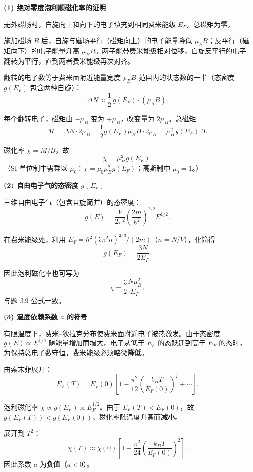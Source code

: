 \begin{derivationbox}[标准解题过程]
\textbf{(1) 绝对零度泡利顺磁化率的证明}

无外磁场时，自旋向上和向下的电子填充到相同费米能级 $E_F$，总磁矩为零。

施加磁场 $B$ 后，自旋与磁场平行（磁矩向上）的电子能量降低 $\mu_BB$；反平行（磁矩向下）的电子能量升高 $\mu_BB$。两子能带费米能级相对位移，自旋反平行的电子翻转为平行，直到两者费米能级再次对齐。

翻转的电子数等于费米面附近能量宽度 $\mu_BB$ 范围内的状态数的一半（态密度 $g(E_F)$ 包含两种自旋）：
\begin{equation}
\Delta N\approx\frac{1}{2}\,g(E_F)\cdot(\mu_BB).
\end{equation}

每个翻转电子，磁矩由 $-\mu_B$ 变为 $+\mu_B$，改变量为 $2\mu_B$。总磁矩
\begin{equation}
M=\Delta N\cdot2\mu_B=\frac{1}{2}g(E_F)\mu_BB\cdot2\mu_B=\mu_B^2\,g(E_F)\,B.
\end{equation}

磁化率 $\chi=M/B$，故
\begin{equation}
\boxed{\chi=\mu_B^2\,g(E_F).}
\end{equation}
（SI 单位制中需乘以 $\mu_0$：$\chi=\mu_0\mu_B^2g(E_F)$；高斯制中 $\mu_0=1$。）

\textbf{(2) 自由电子气的态密度 $g(E_F)$}

三维自由电子气（包含自旋简并）的态密度：
\begin{equation}
g(E)=\frac{V}{2\pi^2}\left(\frac{2m}{\hbar^2}\right)^{3/2}E^{1/2}.
\end{equation}

在费米能级处，利用 $E_F=\hbar^2(3\pi^2n)^{2/3}/(2m)$（$n=N/V$），化简得
\begin{equation}
g(E_F)=\frac{3N}{2E_F}.
\end{equation}

因此泡利磁化率也可写为
\begin{equation}
\chi=\frac{3}{2}\frac{N\mu_B^2}{E_F},
\end{equation}
与题 3.9 公式一致。

\textbf{(3) 温度依赖系数 $a$ 的符号}

有限温度下，费米--狄拉克分布使费米面附近电子被热激发。由于态密度 $g(E)\propto E^{1/2}$ 随能量增加而增大，电子从低于 $E_F$ 的态跃迁到高于 $E_F$ 的态时，为保持总电子数守恒，费米能级必须略微\textbf{降低}。

由索末菲展开：
\begin{equation}
E_F(T)=E_F(0)\left[1-\frac{\pi^2}{12}\left(\frac{k_BT}{E_F(0)}\right)^2+\cdots\right].
\end{equation}

泡利磁化率 $\chi\propto g(E_F)\propto E_F^{1/2}$。由于 $E_F(T)<E_F(0)$，故 $g(E_F(T))<g(E_F(0))$，磁化率随温度升高而\textbf{减小}。

展开到 $T^2$：
\begin{equation}
\chi(T)\approx\chi(0)\left[1-\frac{\pi^2}{24}\left(\frac{k_BT}{E_F(0)}\right)^2\right].
\end{equation}
因此系数 $a$ 为\textbf{负值}（$a<0$）。
\end{derivationbox}

